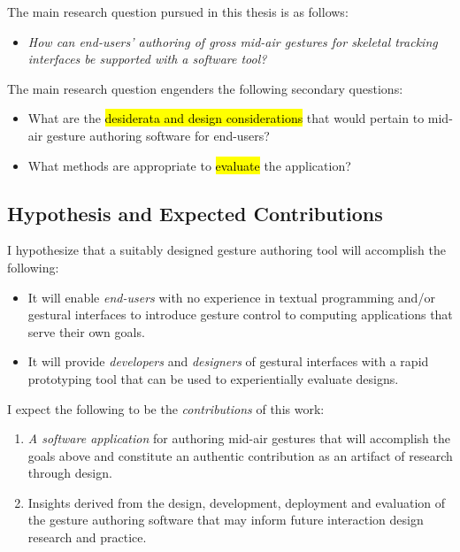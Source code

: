 The main research question pursued in this thesis is as follows:

\begin{itemize}
\item \emph{How can end-users' authoring of gross mid-air gestures for skeletal tracking interfaces be supported with a software tool?}
\end{itemize}

The main research question engenders the following secondary questions:

\begin{itemize}
\item What are the \hl{desiderata and design considerations} that would pertain to mid-air gesture authoring software for end-users?
\item What methods are appropriate to \hl{evaluate} the application?
\end{itemize}

\subsection{Hypothesis and Expected Contributions}

I hypothesize that a suitably designed gesture authoring tool will accomplish the following:

\begin{itemize}
\item It will enable \emph{end-users} with no experience in textual programming and/or gestural interfaces to introduce gesture control to computing applications that serve their own goals.
\item It will provide \emph{developers} and \emph{designers} of gestural interfaces with a rapid prototyping tool that can be used to experientially evaluate designs.
\end{itemize}

\clearpage

I expect the following to be the \emph{contributions} of this work:

\begin{enumerate}
\item \emph{A software application} for authoring mid-air gestures that will accomplish the goals above and constitute an authentic contribution as an artifact of research through design.
\item Insights derived from the design, development, deployment and evaluation of the gesture authoring software that may inform future interaction design research and practice.
\end{enumerate}

